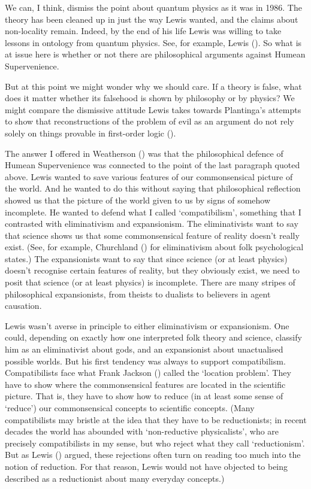 \documentclass[
  10pt,
  letterpaper,
  DIV=11,
  numbers=noendperiod,
  twoside]{scrartcl}
\begin{document}
We can, I think, dismiss the point about quantum physics as it was in
1986. The theory has been cleaned up in just the way Lewis wanted, and
the claims about non-locality remain. Indeed, by the end of his life
Lewis was willing to take lessons in ontology from quantum physics. See,
for example, Lewis (). So what is at
issue here is whether or not there are philosophical arguments against
Humean Supervenience.

But at this point we might wonder why we should care. If a theory is
false, what does it matter whether its falsehood is shown by philosophy
or by physics? We might compare the dismissive attitude Lewis takes
towards Plantinga's attempts to show that reconstructions of the problem
of evil as an argument do not rely solely on things provable in
first-order logic ().

The answer I offered in Weatherson
() was that the philosophical
defence of Humean Supervenience was connected to the point of the last
paragraph quoted above. Lewis wanted to save various features of our
commonsensical picture of the world. And he wanted to do this without
saying that philosophical reflection showed us that the picture of the
world given to us by signs of somehow incomplete. He wanted to defend
what I called `compatibilism', something that I contrasted with
eliminativism and expansionism. The eliminativists want to say that
science shows us that some commonsensical feature of reality doesn't
really exist. (See, for example, Churchland
() for eliminativism about folk
psychological states.) The expansionists want to say that since science
(or at least physics) doesn't recognise certain features of reality, but
they obviously exist, we need to posit that science (or at least
physics) is incomplete. There are many stripes of philosophical
expansionists, from theists to dualists to believers in agent causation.

Lewis wasn't averse in principle to either eliminativism or
expansionism. One could, depending on exactly how one interpreted folk
theory and science, classify him as an eliminativist about gods, and an
expansionist about unactualised possible worlds. But his first tendency
was always to support compatibilism. Compatibilists face what Frank
Jackson () called the `location
problem'. They have to show where the commonsensical features are
located in the scientific picture. That is, they have to show how to
reduce (in at least some sense of `reduce') our commonsensical concepts
to scientific concepts. (Many compatibilists may bristle at the idea
that they have to be reductionists; in recent decades the world has
abounded with `non-reductive physicalists', who are precisely
compatibilists in my sense, but who reject what they call
`reductionism'. But as Lewis () argued,
these rejections often turn on reading too much into the notion of
reduction. For that reason, Lewis would not have objected to being
described as a reductionist about many everyday concepts.)
\end{document}
